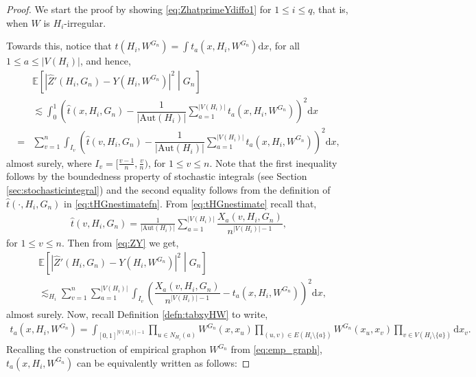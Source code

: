 \documentclass[11pt,reqno]{amsart}
\numberwithin{equation}{section}
\newcommand{\E}{\mathbb{E}}
\newcommand\Aut{\mathrm{Aut}}
\theoremstyle{definition}
\begin{document}
\begin{proof}
    We start the proof by showing \eqref{eq:ZhatprimeYdiffo1} for $1\leq i\leq q$, that is, when $W$ is $H_i$-irregular. 

    Towards this,  notice that $t(H_i, W^{G_n}) = \int t_a(x, H_i, W^{G_n})\mathrm d x$, for all $1\leq a\leq |V(H_i)|$, and hence, 
    \begin{align}\label{eq:ZY}
        & \E\left[\left|\hat Z'(H_i,G_n) - Y(H_i,W^{G_n})\right|^2\middle|G_n\right] \nonumber \\ 
        &\lesssim \int_0^1 \left(\hat t(x, H_i, G_n) - \dfrac{1}{|\mathrm{Aut}(H_{i})|}\sum_{a=1}^{|V(H_{i})|}t_{a}\left(x,H_{i},W^{G_{n}}\right)\right)^2\mathrm dx \nonumber \\
        =&\sum_{v=1}^{n}\int_{I_v}\left(\hat t(v, H_i, G_n) - \dfrac{1}{|\mathrm{Aut}(H_{i})|}\sum_{a=1}^{|V(H_{i})|}t_{a}\left(x,H_{i},W^{G_{n}}\right)\right)^2\mathrm dx , 
    \end{align} 
    almost surely, where $I_v = [ \frac{v-1}{n}, \frac{v}{n})$, for $1 \leq v \leq n$. Note that the first inequality follows by the boundedness property of stochastic integrals (see Section \ref{sec:stochasticintegral}) and the second equality follows from the definition of $\hat t(\cdot, H_i, G_n)$ in \eqref{eq:tHGnestimatefn}. From \eqref{eq:tHGnestimate} recall that,
    \begin{align*}
        \hat t(v, H_i, G_n) = \frac{1}{|\Aut(H_i)|}\sum_{a=1}^{|V(H_i)|}\dfrac{X_a(v, H_i, G_n)}{n^{|V(H_i)|-1}}, 
    \end{align*}
    for $1\leq v\leq n$. Then from \eqref{eq:ZY} we get, 
    \begin{align}\label{eq:ZhatprimeYdiff}
        & \E\left[\left|\hat Z'(H_i,G_n) - Y(H_i,W^{G_n})\right|^2\middle|G_n\right] \nonumber \\ 
        &\lesssim_{H_i}\sum_{v=1}^{n}\sum_{a=1}^{|V(H_i)|}\int_{I_v}\left(\dfrac{X_a(v, H_i, G_n)}{n^{|V(H_i)|-1}} - t_{a}\left(x,H_{i},W^{G_{n}}\right)\right)^2\mathrm dx , 
    \end{align} 
    almost surely. Now, recall Definition \ref{defn:tabxyHW} to write,  
    \begin{align*}
        t_a(x, H_i, W^{G_n}) = \int_{[0,1]^{|V(H_i)|-1}}\prod_{u \in N_{H_i}(a)}W^{G_n}(x,x_u)\prod_{(u, v)\in E(H_i\setminus \{a\})}W^{G_n}(x_u, x_v)\prod_{v \in V(H_i\setminus\{a\})}\mathrm dx_v .
    \end{align*}
    Recalling the construction of empirical graphon $W^{G_n}$ from \eqref{eq:emp_graph}, $t_a(x, H_i, W^{G_n})$ can be equivalently written as follows:   

\end{proof}
\end{document}
